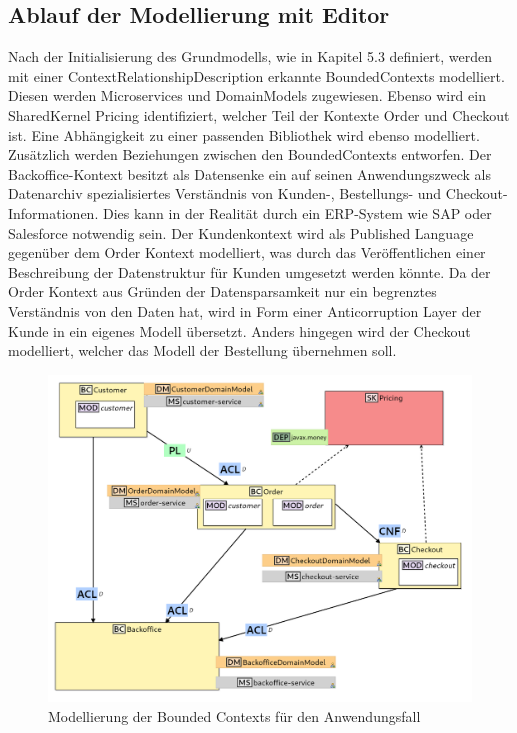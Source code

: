 \newpage

\subsection{Ablauf der Modellierung mit Editor}

Nach der Initialisierung des Grundmodells, wie in Kapitel 5.3 definiert, werden mit einer ContextRelationshipDescription erkannte BoundedContexts modelliert. Diesen werden Microservices und DomainModels zugewiesen. Ebenso wird ein SharedKernel \glqq Pricing\grqq{} identifiziert, welcher Teil der Kontexte \glqq Order\grqq{} und \glqq Checkout\grqq{} ist. Eine Abhängigkeit zu einer passenden Bibliothek wird ebenso modelliert. Zusätzlich werden Beziehungen zwischen den BoundedContexts entworfen. Der \glqq Backoffice\grqq-Kontext besitzt als Datensenke ein auf seinen Anwendungszweck als Datenarchiv spezialisiertes Verständnis von Kunden-, Bestellungs- und Checkout-Informationen. Dies kann in der Realität durch ein ERP-System wie SAP oder Salesforce notwendig sein. Der Kundenkontext wird als Published Language gegenüber dem Order Kontext modelliert, was durch das Veröffentlichen einer Beschreibung der Datenstruktur für Kunden umgesetzt werden könnte. Da der Order Kontext aus Gründen der Datensparsamkeit nur ein begrenztes Verständnis von den Daten hat, wird in Form einer Anticorruption Layer der Kunde in ein eigenes Modell übersetzt. Anders hingegen wird der Checkout modelliert, welcher das Modell der Bestellung übernehmen soll.

\begin{figure}[ht]
\centering
\includegraphics[width=\textwidth]{bilder/k6/1.png}
\caption{Modellierung der Bounded Contexts für den Anwendungsfall}
\end{figure}

